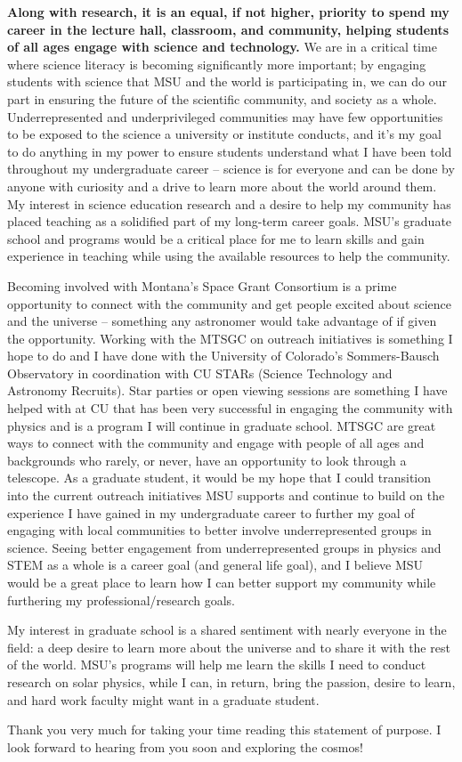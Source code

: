 \documentclass[11pt,letterpaper]{article}
\begin{document}
\textbf{Along with research, it is an equal, if not higher, priority to spend my career in the lecture hall, classroom, and community, helping students of all ages engage with science and technology.} We are in a critical time where science literacy is becoming significantly more important; by engaging students with science that MSU and the world is participating in, we can do our part in ensuring the future of the scientific community, and society as a whole. Underrepresented and underprivileged communities may have few opportunities to be exposed to the science a university or institute conducts, and it’s my goal to do anything in my power to ensure students understand what I have been told throughout my undergraduate career -- science is for everyone and can be done by anyone with curiosity and a drive to learn more about the world around them. My interest in science education research and a desire to help my community has placed teaching as a solidified part of my long-term career goals. MSU’s graduate school and programs would be a critical place for me to learn skills and gain experience in teaching while using the available resources to help the community.

Becoming involved with Montana's Space Grant Consortium is a prime opportunity to connect with the community and get people excited about science and the universe -- something any astronomer would take advantage of if given the opportunity. Working with the MTSGC on outreach initiatives is something I hope to do and I have done with the University of Colorado’s Sommers-Bausch Observatory in coordination with CU STARs (Science Technology and Astronomy Recruits). Star parties or open viewing sessions are something I have helped with at CU that has been very successful in engaging the community with physics and is a program I will continue in graduate school. MTSGC are great ways to connect with the community and engage with people of all ages and backgrounds who rarely, or never, have an opportunity to look through a telescope. As a graduate student, it would be my hope that I could transition into the current outreach initiatives MSU supports and continue to build on the experience I have gained in my undergraduate career to further my goal of engaging with local communities to better involve underrepresented groups in science. Seeing better engagement from underrepresented groups in physics and STEM as a whole is a career goal (and general life goal), and I believe MSU would be a great place to learn how I can better support my community while furthering my professional/research goals.  

My interest in graduate school is a shared sentiment with nearly everyone in the field: a deep desire to learn more about the universe and to share it with the rest of the world. MSU's programs will help me learn the skills I need to conduct research on solar physics, while I can, in return, bring the passion, desire to learn, and hard work faculty might want in a graduate student.

Thank you very much for taking your time reading this statement of purpose. I look forward to hearing from you soon and exploring the cosmos!
\end{document}
